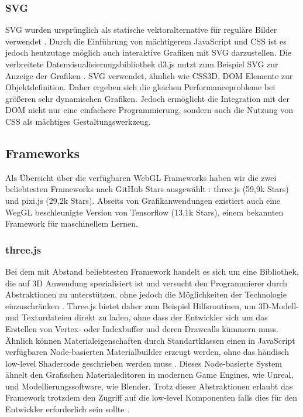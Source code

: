 \subsubsection*{\ac{SVG}}
\ac{SVG} wurden ursprünglich als statische vektoralternative für reguläre Bilder verwendet \cite{quint2003scalable}. Durch die Einführung von mächtigerem JavaScript und CSS ist es jedoch heutzutage möglich auch interaktive Grafiken mit SVG darzustellen. Die verbreitete Datenvisualisierungsbibliothek d3.js nutzt zum Beispiel SVG zur Anzeige der Grafiken \cite{d3info}. SVG verwendet, ähnlich wie CSS3D, \ac{DOM} Elemente zur Objektdefinition. Daher ergeben sich die gleichen Performanceprobleme bei größeren \bzw sehr dynamischen Grafiken. Jedoch ermöglicht die Integration mit der \ac{DOM} nicht nur eine einfachere Programmierung, sondern auch die Nutzung von CSS als mächtiges Gestaltungswerkzeug.
\subsection{Frameworks}
Als Übersicht über die verfügbaren WebGL Frameworks haben wir die zwei beliebtesten Frameworks nach GitHub Stars ausgewählt \cite{githubRanking}: three.js (59,9k Stars) und pixi.js (29,2k Stars). Abseits von Grafikanwendungen existiert auch eine WegGL beschleunigte Version von Tensorflow (13,1k Stars), einem bekannten Framework für maschinellem Lernen.
\subsubsection*{three.js}\cite{threejsGithub} Bei dem mit Abstand beliebtesten Framework handelt es sich um eine Bibliothek, die auf 3D Anwendung spezialisiert ist und versucht den Programmierer durch Abstraktionen zu unterstützen, ohne jedoch die Möglichkeiten der Technologie einzuschränken \cite{threejsGithub}. Three.js bietet daher zum Beispiel Hilfsroutinen, um 3D-Modell- und Texturdateien direkt zu laden, ohne dass der Entwickler sich um das Erstellen von Vertex- oder Indexbuffer und deren Drawcalls kümmern muss. Ähnlich können Materialeigenschaften durch Standartklassen \bzw einen in JavaScript verfügbaren Node-basierten Materialbuilder erzeugt werden, ohne das händisch low-level Shadercode geschrieben werden muss \cite{threeJSNodes}. Dieses Node-basierte System ähnelt den Grafischen Materialeditoren in modernen Game Engines, wie \zb Unreal, und Modellierungssoftware, wie \zb Blender. Trotz dieser Abstraktionen erlaubt das Framework trotzdem den Zugriff auf die low-level Komponenten falls dies für den Entwickler erforderlich sein sollte \cite{threeJSShaders}.

